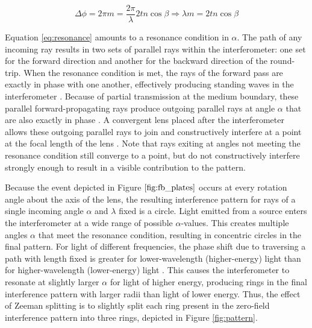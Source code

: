 \documentclass[11pt]{article}
\begin{document}
 \begin{equation}
 \Delta \phi = 2\pi m = \frac{2\pi}{\lambda} 2 t n \cos \beta \Rightarrow  \lambda m = 2tn \cos \beta
 \label{eq:resonance}
 \end{equation}

Equation \ref{eq:resonance} amounts to a resonance condition in $\alpha$. The path of any incoming ray
results in two sets of parallel rays within the interferometer: one set for the forward direction and another for the backward direction of the round-trip. When the resonance condition is met, the rays of the forward pass are exactly in phase with one another, effectively producing standing waves in the interferometer \cite{mel,leybold}. Because of partial transmission at the medium boundary, these parallel forward-propagating rays produce outgoing parallel rays at angle $\alpha$ that are also exactly in phase \cite{leybold, mel}. A convergent lens placed after the interferometer allows these outgoing parallel rays to join and constructively interfere at a point at the focal length of the lens \cite{hecht_optics}. Note that rays exiting at angles not meeting the resonance condition still converge to a point, but do not constructively interfere strongly enough to result in a visible contribution to the pattern.

Because the event depicted in Figure $\ref{fig:fb_plates}$ occurs at every rotation angle about the axis of the lens, the resulting interference pattern for rays of a single incoming angle $\alpha$ and $\lambda$ fixed is a circle. Light emitted from a source enters the interferometer at a wide range of possible $\alpha$-values. This creates multiple angles $\alpha$ that meet the resonance condition, resulting in concentric circles in the final pattern. For light of different frequencies, the phase shift due to traversing a path with length fixed is greater for lower-wavelength (higher-energy) light than for higher-wavelength (lower-energy) light \cite{griff}. This causes the interferometer to resonate at slightly larger $\alpha$ for light of higher energy, producing rings in the final interference pattern with larger radii than light of lower energy. Thus, the effect of Zeeman splitting is to slightly split each ring present in the zero-field interference pattern into three rings, depicted in Figure \ref{fig:pattern}.
\end{document}
